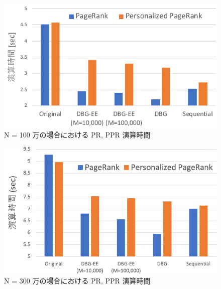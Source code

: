 \begin{figure}[t]
  \centering
  \includegraphics[width=0.8\linewidth]{./figure/algo_time_1000000.pdf}
  \caption{N = 100 万の場合における PR, PPR 演算時間}
  \label{algo_time_1000000}
\end{figure}
\begin{figure}[t]
  \centering
  \includegraphics[width=0.8\linewidth]{./figure/algo_time_3000000.pdf}
  \caption{N = 300 万の場合における PR, PPR 演算時間}
  \label{algo_time_3000000}
\end{figure}
